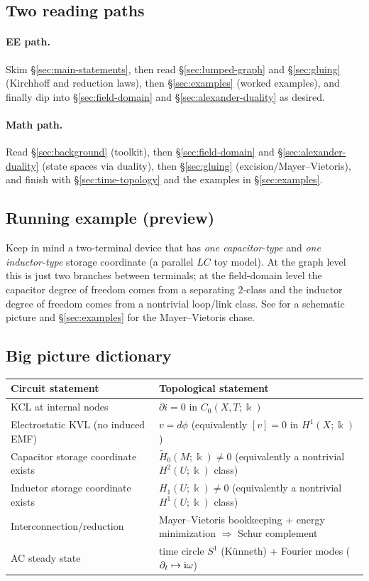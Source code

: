 \documentclass[11pt]{article}
\begin{document}
\subsection*{Two reading paths}
\paragraph{EE path.}
Skim \S\ref{sec:main-statements}, then read \S\ref{sec:lumped-graph} and \S\ref{sec:gluing} (Kirchhoff and reduction laws), then \S\ref{sec:examples} (worked examples), and finally dip into \S\ref{sec:field-domain} and \S\ref{sec:alexander-duality} as desired.

\paragraph{Math path.}
Read \S\ref{sec:background} (toolkit), then \S\ref{sec:field-domain} and \S\ref{sec:alexander-duality} (state spaces via duality), then \S\ref{sec:gluing} (excision/Mayer--Vietoris), and finish with \S\ref{sec:time-topology} and the examples in \S\ref{sec:examples}.

\subsection*{Running example (preview)}
Keep in mind a two-terminal device that has \emph{one capacitor-type} and \emph{one inductor-type} storage coordinate (a parallel $LC$ toy model).
At the graph level this is just two branches between terminals; at the field-domain level the capacitor degree of freedom comes from a separating $2$-class and the inductor degree of freedom comes from a nontrivial loop/link class.
See  for a schematic picture and \S\ref{sec:examples} for the Mayer--Vietoris chase.

\subsection*{Big picture dictionary}
\begin{center}
\begin{tabularx}{0.98\textwidth}{p{}>{\raggedright\arraybackslash}X}
\hline
Circuit statement & Topological statement \\
\hline
KCL at internal nodes & $\partial i=0$ in $C_0(X,T;\Bbbk)$ \\
Electrostatic KVL (no induced EMF) & $v=d\phi$ (equivalently $[v]=0$ in $H^1(X;\Bbbk)$) \\
Capacitor storage coordinate exists & $\widetilde H_0(M;\Bbbk)\neq 0$ (equivalently a nontrivial $H^2(U;\Bbbk)$ class) \\
Inductor storage coordinate exists & $H_1(U;\Bbbk)\neq 0$ (equivalently a nontrivial $H^1(U;\Bbbk)$ class) \\
Interconnection/reduction & Mayer--Vietoris bookkeeping + energy minimization $\Rightarrow$ Schur complement \\
AC steady state & time circle $S^1$ (K\"unneth) + Fourier modes ($\partial_t\mapsto \mathrm{i}\omega$) \\
\hline
\end{tabularx}
\end{center}
\end{document}
